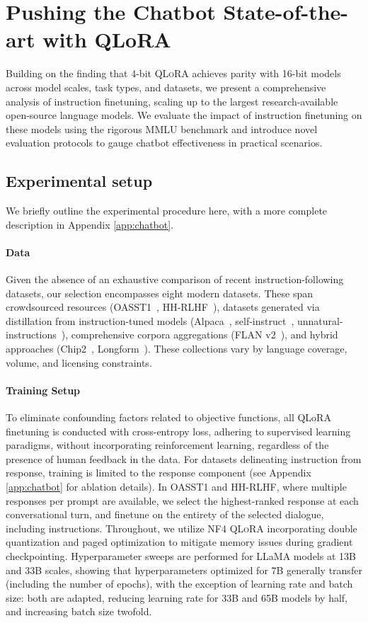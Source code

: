\section{Pushing the Chatbot State-of-the-art with QLoRA}
\label{sec:pushing}
Building on the finding that 4-bit \textsc{QLoRA} achieves parity with 16-bit models across model scales, task types, and datasets, we present a comprehensive analysis of instruction finetuning, scaling up to the largest research-available open-source language models. We evaluate the impact of instruction finetuning on these models using the rigorous MMLU benchmark and introduce novel evaluation protocols to gauge chatbot effectiveness in practical scenarios.

\subsection{Experimental setup} We briefly outline the experimental procedure here, with a more complete description in Appendix \ref{app:chatbot}.

\paragraph{Data} Given the absence of an exhaustive comparison of recent instruction-following datasets, our selection encompasses eight modern datasets. These span crowdsourced resources (OASST1~\citep{kopf2023openassistant}, HH-RLHF~\citep{bai2022training}), datasets generated via distillation from instruction-tuned models (Alpaca~\citep{alpaca}, self-instruct~\citep{wang2022self}, unnatural-instructions~\citep{honovich2022unnatural}), comprehensive corpora aggregations (FLAN v2~\citep{chung2022scaling}), and hybrid approaches (Chip2~\citep{laion2023}, Longform~\citep{koksal2023longform}). These collections vary by language coverage, volume, and licensing constraints.

\paragraph{Training Setup} To eliminate confounding factors related to objective functions, all QLoRA finetuning is conducted with cross-entropy loss, adhering to supervised learning paradigms, without incorporating reinforcement learning, regardless of the presence of human feedback in the data. For datasets delineating instruction from response, training is limited to the response component (see Appendix \ref{app:chatbot} for ablation details). In OASST1 and HH-RLHF, where multiple responses per prompt are available, we select the highest-ranked response at each conversational turn, and finetune on the entirety of the selected dialogue, including instructions. Throughout, we utilize NF4 \textsc{QLoRA} incorporating double quantization and paged optimization to mitigate memory issues during gradient checkpointing. Hyperparameter sweeps are performed for LLaMA models at 13B and 33B scales, showing that hyperparameters optimized for 7B generally transfer (including the number of epochs), with the exception of learning rate and batch size: both are adapted, reducing learning rate for 33B and 65B models by half, and increasing batch size twofold.

